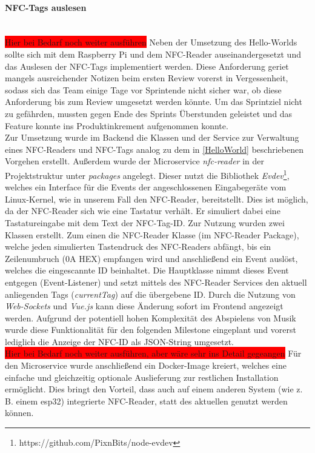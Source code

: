 \documentclass[10pt, a4paper]{article}
\begin{document}
\paragraph*{NFC-Tags auslesen} $~$ \\
\colorbox{red}{Hier bei Bedarf noch weiter ausführen}
Neben der Umsetzung des Hello-Worlds sollte sich mit dem Raspberry Pi und dem NFC-Reader auseinandergesetzt und das Auslesen der NFC-Tags implementiert werden. Diese Anforderung geriet mangels ausreichender Notizen beim ersten Review vorerst
in Vergessenheit, sodass sich das Team einige Tage vor Sprintende nicht sicher war, ob diese Anforderung bis zum Review umgesetzt werden könnte.
Um das Sprintziel nicht zu gefährden, mussten gegen Ende des Sprints Überstunden geleistet und das Feature konnte ins Produktinkrement aufgenommen konnte.
\\
Zur Umsetzung wurde im Backend die Klassen und der Service zur Verwaltung eines NFC-Readers und NFC-Tags
analog zu dem in \ref{HelloWorld} beschriebenen Vorgehen erstellt.
Außerdem wurde der Microservice \textit{nfc-reader} in der Projektstruktur unter \textit{packages}
angelegt. Dieser nutzt die Bibliothek \textit{Evdev}\footnote{https://github.com/PixnBits/node-evdev}, welches ein Interface für die Events der angeschlossenen
Eingabegeräte vom Linux-Kernel, wie in unserem Fall den NFC-Reader, bereitstellt. Dies ist möglich, da der NFC-Reader sich wie eine Tastatur verhält. Er
simuliert dabei eine Tastatureingabe mit dem Text der NFC-Tag-ID. Zur Nutzung wurden zwei Klassen erstellt. Zum einen die NFC-Reader Klasse
(im NFC-Reader Package), welche jeden simulierten Tastendruck des NFC-Readers abfängt, bis ein Zeilenumbruch (0A HEX) empfangen
wird und anschließend ein Event auslöst, welches die eingescannte ID beinhaltet. Die Hauptklasse nimmt dieses Event entgegen (Event-Listener) und setzt mittels des
NFC-Reader Services den aktuell anliegenden Tags (\textit{currentTag}) auf die übergebene ID. Durch die Nutzung von \textit{Web-Sockets} und \textit{Vue.js}
kann diese Änderung sofort im Frontend angezeigt werden. Aufgrund der potentiell hohen Komplexität des Abspielens von Musik wurde diese Funktionalität für den
folgenden Milestone eingeplant und vorerst lediglich die Anzeige der NFC-ID als JSON-String umgesetzt.
\\
\colorbox{red}{Hier bei Bedarf noch weiter ausführen, aber wäre sehr ins Detail gegeangen}
Für den Microservice wurde anschließend ein Docker-Image kreiert, welches eine einfache und gleichzeitig optionale Auslieferung zur restlichen Installation
ermöglicht. Dies bringt den Vorteil, dass auch auf einem anderen System (wie z. B. einem esp32) integrierte NFC-Reader, statt des aktuellen genutzt werden können.
\end{document}
